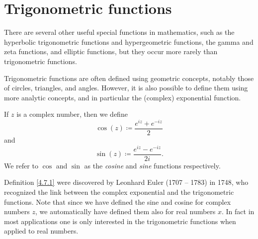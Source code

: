 \section{Trigonometric functions}\label{sec 4.7}

\begin{note}
    There are several other useful special functions in mathematics, such as the hyperbolic trigonometric functions and hypergeometric functions, the gamma and zeta functions, and elliptic functions, but they occur more rarely than trigonometric functions.
\end{note}

\begin{note}
    Trigonometric functions are often defined using geometric concepts, notably those of circles, triangles, and angles.
    However, it is also possible to define them using more analytic concepts, and in particular the (complex) exponential function.
\end{note}

\begin{definition}\label{4.7.1}
    If \(z\) is a complex number, then we define
    \[
        \cos(z) \coloneqq \frac{e^{iz} + e^{-iz}}{2}
    \]
    and
    \[
        \sin(z) \coloneqq \frac{e^{iz} - e^{-iz}}{2i}.
    \]
    We refer to \(\cos\) and \(\sin\) as the \emph{cosine} and \emph{sine} functions respectively.
\end{definition}

\begin{note}
    Definition \ref{4.7.1} were discovered by Leonhard Euler (1707 -- 1783) in 1748, who recognized the link between the complex exponential and the trigonometric functions.
    Note that since we have defined the sine and cosine for complex numbers \(z\), we automatically have defined them also for real numbers \(x\).
    In fact in most applications one is only interested in the trigonometric functions when applied to real numbers.
\end{note}

